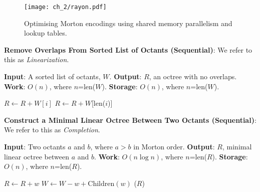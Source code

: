 \begin{figure}
    \centerline{\texttt{[image: ch\_2/rayon.pdf]}}
    \caption{Optimising Morton encodings using shared memory parallelism and lookup tables.}
    \label{fig:sec_2_4:rayon}
\end{figure}

\begin{algorithm}
    \caption{\textbf{Remove Overlaps From Sorted List of Octants (Sequential)}: We refer to this as \textit{Linearization}.}
    \label{alg:sec_2_4:linearise_octree}
    \begin{algorithmic}
    
        \STATE \textbf{Input}: A sorted list of octants, $W$.
        \STATE \textbf{Output}: $R$, an octree with no overlaps.
        \STATE \textbf{Work}: $O(n)$, where $n$=len($W$).
        \STATE \textbf{Storage}: $O(n)$, where $n$=len($W$).
    

                \STATE $R \gets R + W[i]$  
            \ENDIF
        \ENDFOR
        \STATE $R\gets R+W$[len($i$)]
    \end{algorithmic}
\end{algorithm}
    

\begin{algorithm}
    \caption{\textbf{Construct a Minimal Linear Octree Between Two Octants (Sequential)}: We refer to this as \textit{Completion}.}
    \label{alg:sec_2_4:complete_region}
    \begin{algorithmic}
        \STATE \textbf{Input}: Two octants $a$ and $b$, where $a > b$ in Morton order. 
        \STATE \textbf{Output}: $R$, minimal linear octree between $a$ and $b$. 
        \STATE \textbf{Work}: $O(n \log n)$, where $n$=len($R$).
        \STATE \textbf{Storage}: $O(n)$, where $n$=len($R$).

                \STATE $R \gets R + w$
                \STATE $W \gets W - w + \text{Children}(w)$
            \ENDIF
        \ENDFOR
        \STATE {}($R$)
    \end{algorithmic}
\end{algorithm}


